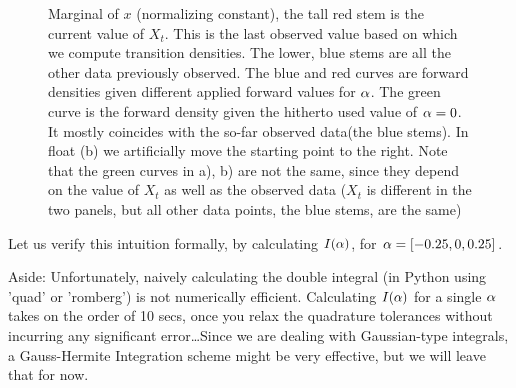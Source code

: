 \begin{figure}[htp]
\begin{center}
  \caption[labelInTOC]{
  Marginal of $x$ (normalizing constant), the tall red stem
  is the current value of $X_t$. This is the last observed value based on
  which we compute transition densities. The lower, blue stems are all the
  other data previously observed. The blue and red curves are forward densities
  given different applied forward values for $\alpha$. The green curve is the forward density given the hitherto used value of $\alpha=0$. It mostly coincides
  with the so-far observed data(the blue stems).
  In float (b) we artificially move the starting point to the right. Note that
  the green curves in a), b) are not the same, since they depend on the value
  of $X_t$ as well as the observed data ($X_t$ is different in the two
  panels, but all other data points, the blue stems, are the same)}
\end{center}
\end{figure}

Let us verify this intuition formally, by calculating $I(\alpha)$, for $\alpha =[-0.25 , 0, 0.25]$.

Aside: Unfortunately, naively calculating the double integral (in Python using
'quad' or 'romberg') is not numerically efficient. Calculating $I(\alpha)$ for a
single $\alpha$ takes on the order of 10 secs, once you relax the quadrature
tolerances without incurring any significant error\ldots Since we are dealing
with Gaussian-type integrals, a Gauss-Hermite Integration scheme might be very
effective, but we will leave that for now.

